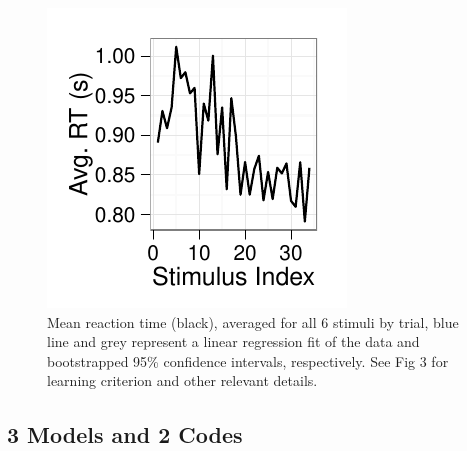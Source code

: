 \documentclass[doc,12pt]{apa}        %
\begin{document}
\begin{figure}[tp]
	\includegraphics{f_all_mean_rt}
    \centering
	\caption{Mean reaction time (black), averaged for all 6 stimuli by trial, blue line and grey represent a linear regression fit of the data and bootstrapped 95\% confidence intervals, respectively. See Fig 3 for learning criterion and other relevant details.}
	\label{fig:meanrt}
\end{figure}

\subsection{3 Models and 2 Codes}
\label{sub:threemodels}
\end{document}
